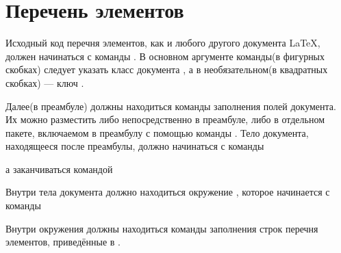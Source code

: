 
\section{Перечень элементов}

Исходный код перечня элементов, как и любого другого документа \LaTeX{}, должен
начинаться с команды . В основном аргументе
команды(в фигурных скобках) следует указать класс документа , а в
необязательном(в квадратных скобках) --- ключ .


Далее(в преамбуле) должны находиться команды заполнения полей документа. Их можно
разместить либо непосредственно в преамбуле, либо в отдельном пакете, включаемом в
преамбулу с помощью команды . Тело документа,
находящееся после преамбулы, должно начинаться с команды

\begin{pcbdoccode}

\end{pcbdoccode}

а заканчиваться командой

\begin{pcbdoccode}

\end{pcbdoccode}

Внутри тела документа должно находиться
окружение , которое начинается с команды

\begin{pcbdoccode}
\end{pcbdoccode}

Внутри окружения  должны находиться команды заполнения строк
перечня элементов, приведённые в .\newpage


